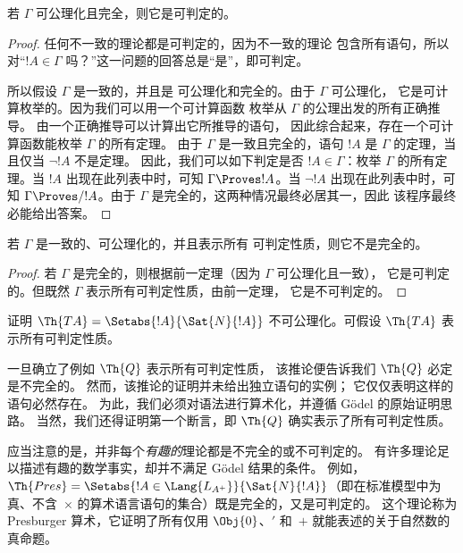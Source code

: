 \documentclass[../../../include/open-logic-section]{subfiles}
\begin{document}
\begin{thm}
若 $\Gamma$ 可公理化且完全，则它是可判定的。
\end{thm}

\begin{proof}
任何不一致的理论都是可判定的，因为不一致的理论
包含所有语句，所以对“$!A \in
\Gamma$ 吗？”这一问题的回答总是“是”，即可判定。

所以假设 $\Gamma$ 是一致的，并且是
可公理化和完全的。由于 $\Gamma$ 可公理化，
它是可计算枚举的。因为我们可以用一个可计算函数
枚举从 $\Gamma$ 的公理出发的所有正确推导。
由一个正确推导可以计算出它所推导的语句，
因此综合起来，存在一个可计算函数能枚举 $\Gamma$ 的所有定理。
由于 $\Gamma$ 是一致且完全的，语句 $!A$ 是 $\Gamma$ 的定理，当且仅当 $\lnot !A$ 不是定理。
因此，我们可以如下判定是否 $!A \in
\Gamma$：枚举 $\Gamma$ 的所有定理。当 $!A$
出现在此列表中时，可知 $\Gamma \Proves !A$。当 $\lnot
!A$ 出现在此列表中时，可知 $\Gamma \Proves/ !A$。由于
$\Gamma$ 是完全的，这两种情况最终必居其一，因此
该程序最终必能给出答案。
\end{proof}

\begin{cor}
若 $\Gamma$ 是一致的、可公理化的，并且表示所有
可判定性质，则它不是完全的。
\end{cor}

\begin{proof}
若 $\Gamma$ 是完全的，则根据前一定理（因为 $\Gamma$ 可公理化且一致），
它是可判定的。但既然 $\Gamma$ 表示所有可判定性质，由前一定理，
它是不可判定的。
\end{proof}

\begin{prob}
证明 $\Th{TA} = \Setabs{!A}{\Sat{N}{!A}}$ 不可公理化。可假设 $\Th{TA}$ 表示所有可判定性质。
\end{prob}

一旦确立了例如 $\Th{Q}$ 表示所有可判定性质，
该推论便告诉我们 $\Th{Q}$ 必定是不完全的。
然而，该推论的证明并未给出独立语句的实例；
它仅仅表明这样的语句必然存在。
为此，我们必须对语法进行算术化，并遵循 Gödel 的原始证明思路。
当然，我们还得证明第一个断言，即 $\Th{Q}$ 确实表示了所有可判定性质。

应当注意的是，并非每个\emph{有趣的}理论都是不完全的或不可判定的。
有许多理论足以描述有趣的数学事实，却并不满足 Gödel 结果的条件。
例如，$\Th{Pres} = \Setabs{!A \in \Lang{L_{A^+}}}{\Sat{N}{!A}}$（即在标准模型中为真、不含~$\times$ 的算术语言语句的集合）既是完全的，又是可判定的。
这个理论称为 Presburger 算术，它证明了所有仅用 $\Obj{0}$、$\prime$ 和~$+$ 就能表述的关于自然数的真命题。
\end{document}
